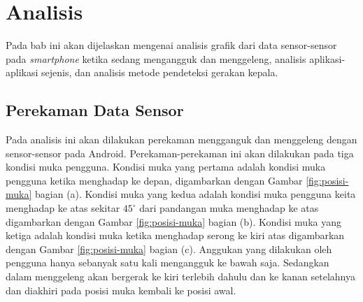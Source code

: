\chapter{Analisis}
\label{chap:analisis}

Pada bab ini akan dijelaskan mengenai analisis grafik dari data sensor-sensor pada \textit{smartphone} ketika sedang mengangguk dan menggeleng, analisis aplikasi-aplikasi sejenis, dan analisis metode pendeteksi gerakan kepala. 

\section{Perekaman Data Sensor}
\label{sec:perekaman_data_sensor}

Pada analisis ini akan dilakukan perekaman mengganguk dan menggeleng dengan sensor-sensor pada Android. Perekaman-perekaman ini akan dilakukan pada tiga kondisi muka pengguna. Kondisi muka yang pertama adalah kondisi muka pengguna ketika menghadap ke depan, digambarkan dengan Gambar \ref{fig:posisi-muka} bagian (a). Kondisi muka yang kedua adalah kondisi muka pengguna keita menghadap ke atas sekitar $45^{\circ}$ dari pandangan muka menghadap ke atas digambarkan dengan Gambar \ref{fig:posisi-muka} bagian (b). Kondisi muka yang ketiga adalah kondisi muka ketika menghadap serong ke kiri atas digambarkan dengan Gambar \ref{fig:posisi-muka} bagian (c). Anggukan yang dilakukan oleh pengguna hanya sebanyak satu kali mengangguk ke bawah saja. Sedangkan dalam menggeleng akan bergerak ke kiri terlebih dahulu dan ke kanan setelahnya dan diakhiri pada posisi muka kembali ke posisi awal.

